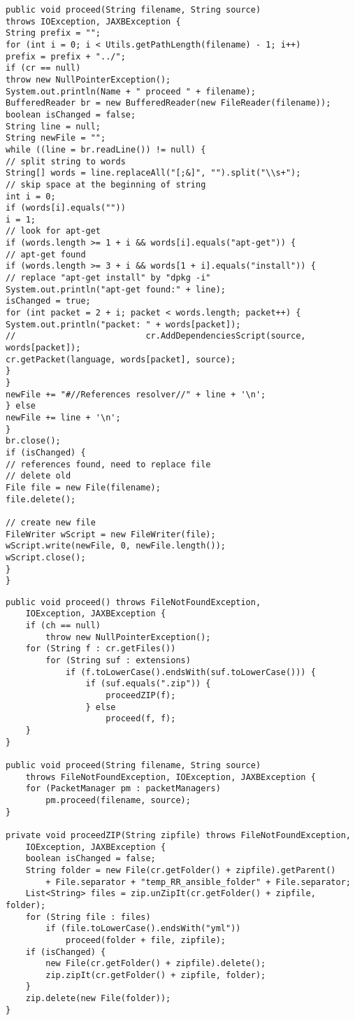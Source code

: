 \begin{Listing}
\caption{File parsing for Bash + apt-get }
\label{lst:bash_apt_parse}
\begin{lstlisting}
public void proceed(String filename, String source)
throws IOException, JAXBException {
String prefix = "";
for (int i = 0; i < Utils.getPathLength(filename) - 1; i++)
prefix = prefix + "../";
if (cr == null)
throw new NullPointerException();
System.out.println(Name + " proceed " + filename);
BufferedReader br = new BufferedReader(new FileReader(filename));
boolean isChanged = false;
String line = null;
String newFile = "";
while ((line = br.readLine()) != null) {
// split string to words
String[] words = line.replaceAll("[;&]", "").split("\\s+");
// skip space at the beginning of string
int i = 0;
if (words[i].equals(""))
i = 1;
// look for apt-get
if (words.length >= 1 + i && words[i].equals("apt-get")) {
// apt-get found
if (words.length >= 3 + i && words[1 + i].equals("install")) {
// replace "apt-get install" by "dpkg -i"
System.out.println("apt-get found:" + line);
isChanged = true;
for (int packet = 2 + i; packet < words.length; packet++) {
System.out.println("packet: " + words[packet]);
//							cr.AddDependenciesScript(source, words[packet]);
cr.getPacket(language, words[packet], source);
}
}
newFile += "#//References resolver//" + line + '\n';
} else
newFile += line + '\n';
}
br.close();
if (isChanged) {
// references found, need to replace file
// delete old
File file = new File(filename);
file.delete();

// create new file
FileWriter wScript = new FileWriter(file);
wScript.write(newFile, 0, newFile.length());
wScript.close();
}
}
\end{lstlisting}
\end{Listing}

\begin{Listing}
\caption{Ansible proceeding}
\label{lst:ansible_proceed}
\begin{lstlisting}
public void proceed() throws FileNotFoundException,
	IOException, JAXBException {
	if (ch == null)
		throw new NullPointerException();
	for (String f : cr.getFiles())
		for (String suf : extensions)
			if (f.toLowerCase().endsWith(suf.toLowerCase())) {
				if (suf.equals(".zip")) {
					proceedZIP(f);
				} else
					proceed(f, f);
	}
}

public void proceed(String filename, String source)
	throws FileNotFoundException, IOException, JAXBException {
	for (PacketManager pm : packetManagers)
		pm.proceed(filename, source);
} 

private void proceedZIP(String zipfile) throws FileNotFoundException,
	IOException, JAXBException {
	boolean isChanged = false;
	String folder = new File(cr.getFolder() + zipfile).getParent()
		+ File.separator + "temp_RR_ansible_folder" + File.separator;
	List<String> files = zip.unZipIt(cr.getFolder() + zipfile, folder);
	for (String file : files)
		if (file.toLowerCase().endsWith("yml"))
			proceed(folder + file, zipfile);
	if (isChanged) {
		new File(cr.getFolder() + zipfile).delete();
		zip.zipIt(cr.getFolder() + zipfile, folder);
	}
	zip.delete(new File(folder));
}
\end{lstlisting}
\end{Listing}